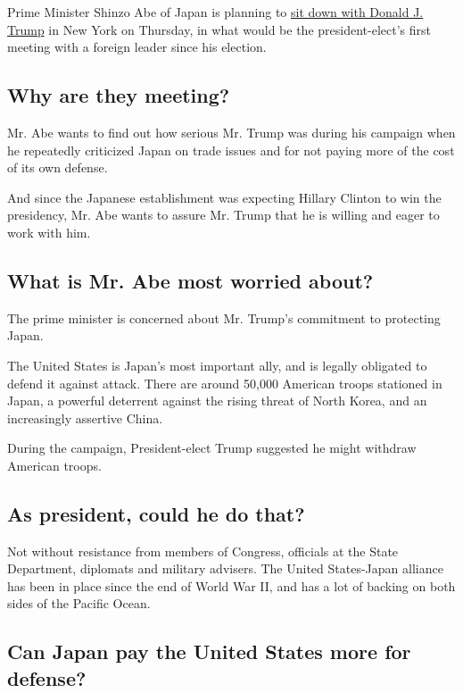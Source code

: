 Prime Minister Shinzo Abe of Japan is planning to
\href{http://www.nytimes.com/2016/11/11/world/asia/japan-donald-trump-shinzo-abe.html}{sit
down with Donald J. Trump} in New York on Thursday, in what would be the
president-elect's first meeting with a foreign leader since his
election.

\hypertarget{why-are-they-meeting}{%
\subsection{Why are they meeting?}\label{why-are-they-meeting}}

Mr. Abe wants to find out how serious Mr. Trump was during his campaign
when he repeatedly criticized Japan on trade issues and for not paying
more of the cost of its own defense.

And since the Japanese establishment was expecting Hillary Clinton to
win the presidency, Mr. Abe wants to assure Mr. Trump that he is willing
and eager to work with him.

\hypertarget{what-is-mr-abe-most-worried-about}{%
\subsection{What is Mr. Abe most worried
about?}\label{what-is-mr-abe-most-worried-about}}

The prime minister is concerned about Mr. Trump's commitment to
protecting Japan.

The United States is Japan's most important ally, and is legally
obligated to defend it against attack. There are around 50,000 American
troops stationed in Japan, a powerful deterrent against the rising
threat of North Korea, and an increasingly assertive China.

During the campaign, President-elect Trump suggested he might withdraw
American troops.

\hypertarget{as-president-could-he-do-that}{%
\subsection{As president, could he do
that?}\label{as-president-could-he-do-that}}

Not without resistance from members of Congress, officials at the State
Department, diplomats and military advisers. The United States-Japan
alliance has been in place since the end of World War II, and has a lot
of backing on both sides of the Pacific Ocean.

\hypertarget{can-japan-pay-the-united-states-more-for-defense}{%
\subsection{Can Japan pay the United States more for
defense?}\label{can-japan-pay-the-united-states-more-for-defense}}

